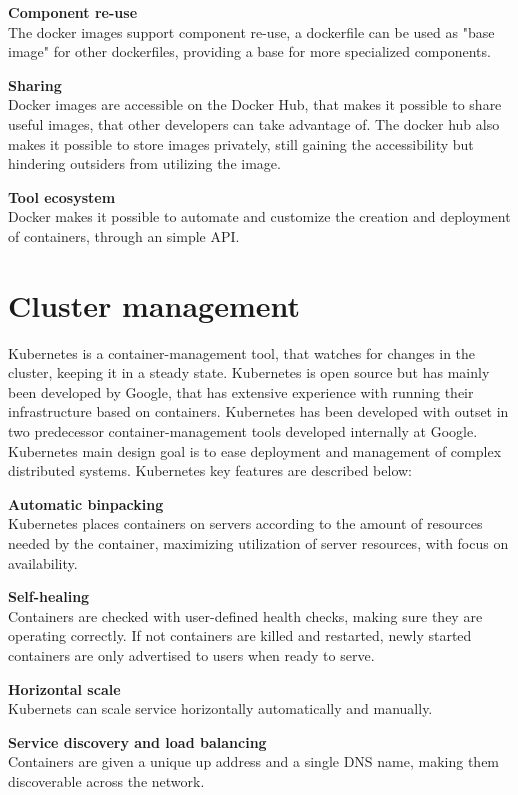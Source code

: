 \textbf{Component re-use}\\
The docker images support component re-use, a dockerfile can be used as "base image" for other dockerfiles, providing a base for more specialized components.

\textbf{Sharing}\\
Docker images are accessible on the Docker Hub, that makes it possible to share useful images, that other developers can take advantage of. The docker hub also makes it possible to store images privately, still gaining the accessibility but hindering outsiders from utilizing the image.

\textbf{Tool ecosystem}\\
Docker makes it possible to automate and customize the creation and deployment of containers, through an simple API.

\section{Cluster management}
Kubernetes is a container-management tool, that watches for changes in the cluster, keeping it in a steady state\cite{2016borg}. Kubernetes is open source but has mainly been developed by Google, that has extensive experience with running their infrastructure based on containers. Kubernetes has been developed with outset in two predecessor container-management tools developed internally at Google. Kubernetes main design goal is to ease deployment and management of complex distributed systems\cite{kubernetes_frontpage}. Kubernetes key features are described below:

\textbf{Automatic binpacking}\\
Kubernetes places containers on servers according to the amount of resources needed by the container, maximizing utilization of server resources, with focus on availability.

\textbf{Self-healing}\\
Containers are checked with user-defined health checks, making sure they are operating correctly. If not containers are killed and restarted, newly started containers are only advertised to users when ready to serve.

\textbf{Horizontal scale}\\
Kubernets can scale service horizontally automatically and manually.

\textbf{Service discovery and load balancing}\\
Containers are given a unique up address and a single DNS name, making them discoverable across the network.

